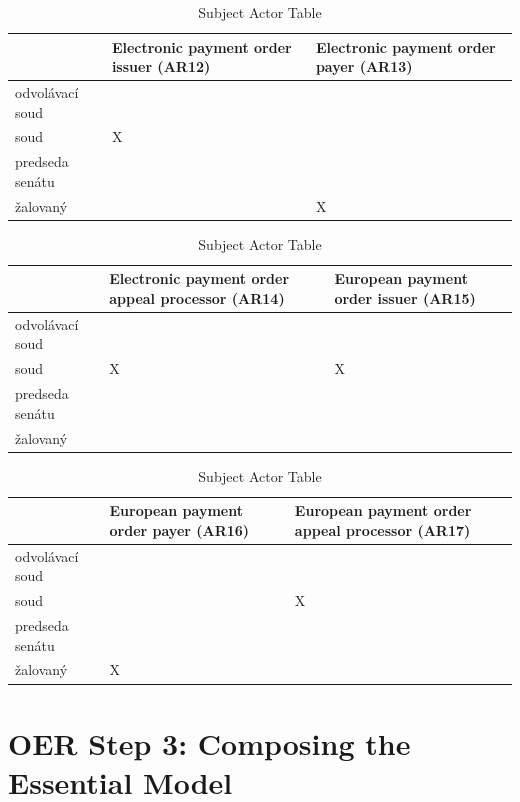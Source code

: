 \begin{landscape}
\begin{table}[h]
\caption{Subject Actor Table}
\label{tab:subjectactortable}
\begin{tabular}{|l|l|l|}
\hline
    &  Electronic payment order issuer (AR12) &   Electronic payment order payer (AR13)   \\ \hline
odvolávací soud &  &   \\ \hline
soud &  X &    \\ \hline
predseda senátu &  &    \\ \hline
žalovaný & & X  \\ \hline
\end{tabular}
\end{table}

\begin{table}[h]
\caption{Subject Actor Table}
\label{tab:subjectactortable}
\begin{tabular}{|l|l|l|}
\hline
 &  Electronic payment order appeal processor (AR14)  &   European payment order issuer (AR15)   \\ \hline
odvolávací soud &  &   \\ \hline
soud &  X & X   \\ \hline
predseda senátu &  &    \\ \hline
žalovaný & &  \\ \hline
\end{tabular}
\end{table}

\begin{table}[h]
\caption{Subject Actor Table}
\label{tab:subjectactortable}
\begin{tabular}{|l|l|l|}
\hline
   &  European payment order payer (AR16) & European payment order appeal processor (AR17)    \\ \hline
odvolávací soud &  &   \\ \hline
soud &   & X   \\ \hline
predseda senátu &  &    \\ \hline
žalovaný & X &  \\ \hline
\end{tabular}
\end{table}

\end{landscape}

\section{OER Step 3: Composing the Essential Model}

